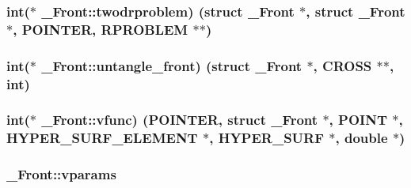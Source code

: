 \subsubsection[{\texorpdfstring{twodrproblem}{twodrproblem}}]{\setlength{\rightskip}{0pt plus 5cm}int($\ast$ \+\_\+\+Front\+::twodrproblem) (struct {\bf \+\_\+\+Front} $\ast$, struct {\bf \+\_\+\+Front} $\ast$, {\bf P\+O\+I\+N\+T\+ER}, {\bf R\+P\+R\+O\+B\+L\+EM} $\ast$$\ast$)}\hypertarget{struct___front_a077aa1c247c7256e0378e5775f050f75}{}\label{struct___front_a077aa1c247c7256e0378e5775f050f75}
\subsubsection[{\texorpdfstring{untangle\+\_\+front}{untangle_front}}]{\setlength{\rightskip}{0pt plus 5cm}int($\ast$ \+\_\+\+Front\+::untangle\+\_\+front) (struct {\bf \+\_\+\+Front} $\ast$, {\bf C\+R\+O\+SS} $\ast$$\ast$, int)}\hypertarget{struct___front_ae1088686d23126bfd2e8292690c0bd1d}{}\label{struct___front_ae1088686d23126bfd2e8292690c0bd1d}
\subsubsection[{\texorpdfstring{vfunc}{vfunc}}]{\setlength{\rightskip}{0pt plus 5cm}int($\ast$ \+\_\+\+Front\+::vfunc) ({\bf P\+O\+I\+N\+T\+ER}, struct {\bf \+\_\+\+Front} $\ast$, {\bf P\+O\+I\+NT} $\ast$, {\bf H\+Y\+P\+E\+R\+\_\+\+S\+U\+R\+F\+\_\+\+E\+L\+E\+M\+E\+NT} $\ast$, {\bf H\+Y\+P\+E\+R\+\_\+\+S\+U\+RF} $\ast$, double $\ast$)}\hypertarget{struct___front_a0b0ae44ea8e488ee26251aeb28874e22}{}\label{struct___front_a0b0ae44ea8e488ee26251aeb28874e22}
\subsubsection[{\texorpdfstring{vparams}{vparams}}]{ \+\_\+\+Front\+::vparams}\hypertarget{struct___front_a123db166e0ed2418b0bd9f5195ea6eee}{}\label{struct___front_a123db166e0ed2418b0bd9f5195ea6eee}
